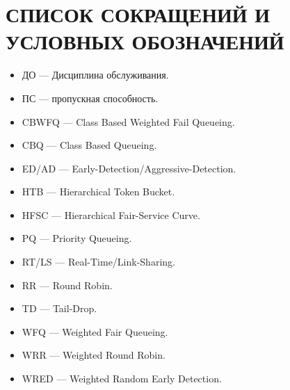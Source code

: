 \documentclass[14pt, a4paper] {extarticle}
\begin{document}
    \setcounter{figure}{0}
    \newcommand{\mc}[0]{\makecell}
    \newcommand\setrow[1]{\gdef\rowmac{#1}#1\ignorespaces}
    \newcommand\clearrow{\global\let\rowmac\relax}
    \clearrow
    \setcounter{page}{3}

   \tableofcontents

	\newpage
	


	\newpage
	


	\newpage
	

	\newpage
	

	\newpage
	

	\newpage
\begingroup
\let\itshape\upshape

    \renewcommand{\refname}{СПИСОК ИСПОЛЬЗОВАННЫХ ИСТОЧНИКОВ}
    
 
	\newpage
    \section*{СПИСОК СОКРАЩЕНИЙ И УСЛОВНЫХ ОБОЗНАЧЕНИЙ}

    \begin{itemize}
		\item ДО --- Дисциплина обслуживания.
		\item ПС --- пропускная способность.
    	\item CBWFQ --- Class Based Weighted Fail Queueing.
		\item CBQ --- Class Based Queueing.
		\item ED/AD --- Early-Detection/Aggressive-Detection.
		\item HTB ---  Hierarchical Token Bucket.
		\item HFSC --- Hierarchical Fair-Service Curve.
		\item PQ --- Priority Queueing.
		\item RT/LS --- Real-Time/Link-Sharing.
		\item RR --- Round Robin.
		\item TD --- Tail-Drop.
		\item WFQ --- Weighted Fair Queueing.
		\item WRR --- Weighted Round Robin.
		\item WRED --- Weighted Random Early Detection.
    \end{itemize}
\end{document}
